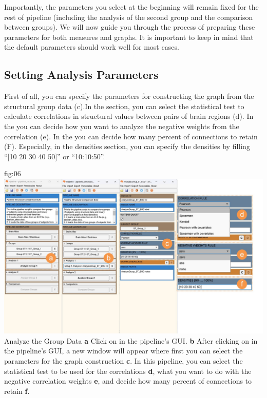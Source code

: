 \documentclass[justified]{tufte-handout}
\begin{document}
Importantly, the parameters you select at the beginning will remain fixed for the rest of pipeline (including the analysis of the second group and the comparison between groups). We will now guide you through the process of preparing these parameters for both measures and graphs. It is important to keep in mind that the default parameters should work well for most cases.

\subsection{Setting Analysis Parameters}


First of all, you can specify the parameters for constructing the graph from the structural group data (c).In the  section, you can select the statistical test to calculate correlations in structural values between pairs of brain regions (d).
In the  you can decide how you want to analyze the negative weights from the correlation (e). 
In the  you can decide how many percent of connections to retain (F). Especially, in the densities section, you can specify the densities by filling “[10 20 30 40 50]” or “10:10:50”.

	{fig:06}
	{
	\includegraphics{fig06.jpg}
	}
	{Analyze the Group Data}
	{
	{\bf a} Click on  in the pipeline's GUI.
        {\bf b} After clicking on  in the pipeline's GUI, a new window will appear where first you can select the parameters for the graph construction {\bf c}. In this pipeline, you can select the statistical test to be used for the correlations {\bf d}, what you want to do with the negative correlation weights {\bf e}, and decide how many percent of connections to retain {\bf f}.
	}
\end{document}
